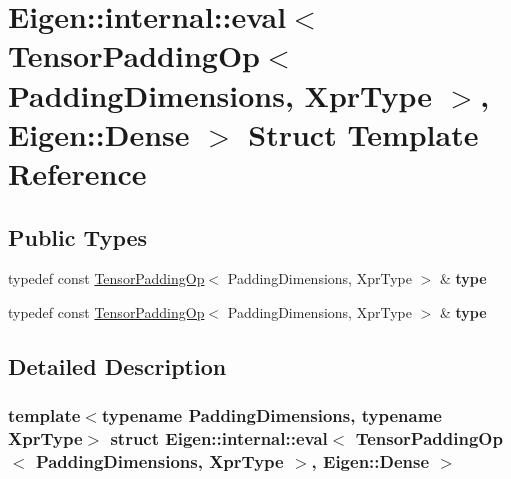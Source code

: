 \hypertarget{struct_eigen_1_1internal_1_1eval_3_01_tensor_padding_op_3_01_padding_dimensions_00_01_xpr_type_01_4_00_01_eigen_1_1_dense_01_4}{}\section{Eigen\+:\+:internal\+:\+:eval$<$ Tensor\+Padding\+Op$<$ Padding\+Dimensions, Xpr\+Type $>$, Eigen\+:\+:Dense $>$ Struct Template Reference}
\label{struct_eigen_1_1internal_1_1eval_3_01_tensor_padding_op_3_01_padding_dimensions_00_01_xpr_type_01_4_00_01_eigen_1_1_dense_01_4}
\subsection*{Public Types}
\begin{DoxyCompactItemize}
\item 
\mbox{\label{struct_eigen_1_1internal_1_1eval_3_01_tensor_padding_op_3_01_padding_dimensions_00_01_xpr_type_01_4_00_01_eigen_1_1_dense_01_4_ab1bf7c7756ead0993f84caf1f88a46bd}} 
typedef const \hyperlink{class_eigen_1_1_tensor_padding_op}{Tensor\+Padding\+Op}$<$ Padding\+Dimensions, Xpr\+Type $>$ \& {\bfseries type}
\item 
\mbox{\label{struct_eigen_1_1internal_1_1eval_3_01_tensor_padding_op_3_01_padding_dimensions_00_01_xpr_type_01_4_00_01_eigen_1_1_dense_01_4_ab1bf7c7756ead0993f84caf1f88a46bd}} 
typedef const \hyperlink{class_eigen_1_1_tensor_padding_op}{Tensor\+Padding\+Op}$<$ Padding\+Dimensions, Xpr\+Type $>$ \& {\bfseries type}
\end{DoxyCompactItemize}


\subsection{Detailed Description}
\subsubsection*{template$<$typename Padding\+Dimensions, typename Xpr\+Type$>$\newline
struct Eigen\+::internal\+::eval$<$ Tensor\+Padding\+Op$<$ Padding\+Dimensions, Xpr\+Type $>$, Eigen\+::\+Dense $>$}



